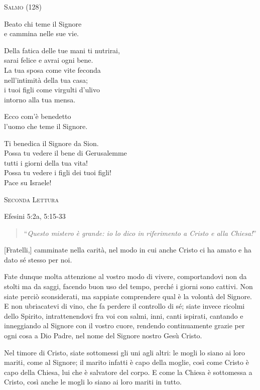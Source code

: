 \documentclass[12pt,twoside]{article}
\newcommand{\masssubpart}[1]{\bigskip

  {\large\scshape #1}}
\newcommand{\reading}[1]{#1}
\newcommand{\readingquote}[1]{
\begin{quote}
``\textit{#1}''
\end{quote}
}
\begin{document}
{\newpage

\masssubpart{Salmo (128)}

Beato chi teme il Signore\\
e cammina nelle sue vie.

Della fatica delle tue mani ti nutrirai,\\
sarai felice e avrai ogni bene.\\
La tua sposa come vite feconda\\
nell'intimità della tua casa;\\
i tuoi figli come virgulti d'ulivo\\
intorno alla tua mensa.

Ecco com'è benedetto\\
l'uomo che teme il Signore.

Ti benedica il Signore da Sion.\\
Possa tu vedere il bene di Gerusalemme\\
tutti i giorni della tua vita!\\
Possa tu vedere i figli dei tuoi figli!\\
Pace su Israele!

\masssubpart{Seconda Lettura}

\reading{Efesini 5:2a, 5:15-33}
\readingquote{Questo mistero è grande: io lo dico in riferimento a Cristo e alla Chiesa!}

[Fratelli,] camminate nella carità, nel modo in cui anche Cristo ci ha amato e ha dato sé stesso per noi.

Fate dunque molta attenzione al vostro modo di vivere, comportandovi non da stolti ma da saggi, facendo buon uso del tempo, perché i giorni sono cattivi. Non siate perciò sconsiderati, ma sappiate comprendere qual è la volontà del Signore. E non ubriacatevi di vino, che fa perdere il controllo di sé; siate invece ricolmi dello Spirito, intrattenendovi fra voi con salmi, inni, canti ispirati, cantando e inneggiando al Signore con il vostro cuore, rendendo continuamente grazie per ogni cosa a Dio Padre, nel nome del Signore nostro Gesù Cristo.

Nel timore di Cristo, siate sottomessi gli uni agli altri: le mogli lo siano ai loro mariti, come al Signore; il marito infatti è capo della moglie, così come Cristo è capo della Chiesa, lui che è salvatore del corpo. E come la Chiesa è sottomessa a Cristo, così anche le mogli lo siano ai loro mariti in tutto.

}
\end{document}
